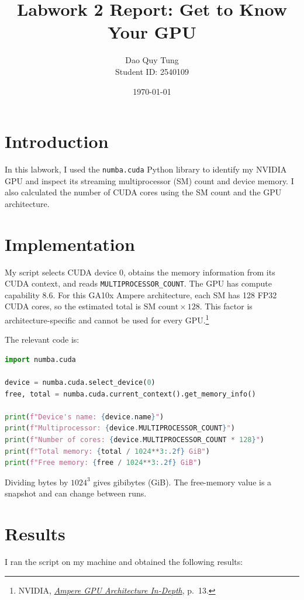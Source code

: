 \documentclass[12pt,a4paper]{article}
\title{Labwork 2 Report: Get to Know Your GPU}
\author{Dao Quy Tung \\ Student ID: 2540109}
\date{\today}
\begin{document}
\maketitle

\section{Introduction}
In this labwork, I used the \texttt{numba.cuda} Python library to identify my NVIDIA GPU and inspect its streaming multiprocessor (SM) count and device memory. I also calculated the number of CUDA cores using the SM count and the GPU architecture.

\section{Implementation}
My script selects CUDA device 0, obtains the memory information from its CUDA context, and reads \texttt{MULTIPROCESSOR\_COUNT}. The GPU has compute capability 8.6. For this GA10x Ampere architecture, each SM has 128 FP32 CUDA cores, so the estimated total is \(\text{SM count}\times128\). This factor is architecture-specific and cannot be used for every GPU.\footnote{NVIDIA, \href{https://images.nvidia.com/aem-dam/en-zz/Solutions/geforce/ampere/pdf/NVIDIA-ampere-GA102-GPU-Architecture-Whitepaper-V1.pdf}{\emph{Ampere GPU Architecture In-Depth}}, p.~13.}

The relevant code is:

\begin{lstlisting}[language=Python,basicstyle=\ttfamily\small,breaklines=true]
import numba.cuda

device = numba.cuda.select_device(0)
free, total = numba.cuda.current_context().get_memory_info()

print(f"Device's name: {device.name}")
print(f"Multiprocessor: {device.MULTIPROCESSOR_COUNT}")
print(f"Number of cores: {device.MULTIPROCESSOR_COUNT * 128}")
print(f"Total memory: {total / 1024**3:.2f} GiB")
print(f"Free memory: {free / 1024**3:.2f} GiB")
\end{lstlisting}

Dividing bytes by \(1024^3\) gives gibibytes (GiB). The free-memory value is a snapshot and can change between runs.

\section{Results}
I ran the script on my machine and obtained the following results:
\end{document}

